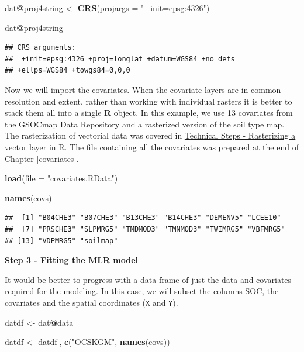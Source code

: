 \documentclass[10pt,b5paper,]{book}
\newenvironment{Shaded}{\begin{snugshade}}{\end{snugshade}}
\newcommand{\DataTypeTok}[1]{\textcolor[rgb]{0.13,0.29,0.53}{#1}}
\newcommand{\KeywordTok}[1]{\textcolor[rgb]{0.13,0.29,0.53}{\textbf{#1}}}
\newcommand{\NormalTok}[1]{#1}
\newcommand{\OperatorTok}[1]{\textcolor[rgb]{0.81,0.36,0.00}{\textbf{#1}}}
\newcommand{\StringTok}[1]{\textcolor[rgb]{0.31,0.60,0.02}{#1}}
\theoremstyle{definition}
\theoremstyle{definition}
\theoremstyle{definition}
\theoremstyle{remark}
\begin{document}
\begin{Shaded}
\begin{Highlighting}[]
\NormalTok{dat}\OperatorTok{@}\NormalTok{proj4string <-}\StringTok{ }\KeywordTok{CRS}\NormalTok{(}\DataTypeTok{projargs =} \StringTok{"+init=epsg:4326"}\NormalTok{)}

\NormalTok{dat}\OperatorTok{@}\NormalTok{proj4string}
\end{Highlighting}
\end{Shaded}

\begin{verbatim}
## CRS arguments:
##  +init=epsg:4326 +proj=longlat +datum=WGS84 +no_defs
## +ellps=WGS84 +towgs84=0,0,0
\end{verbatim}

Now we will import the covariates. When the covariate layers are in
common resolution and extent, rather than working with individual
rasters it is better to stack them all into a single \textbf{R} object.
In this example, we use 13 covariates from the GSOCmap Data Repository
and a rasterized version of the soil type map. The rasterization of
vectorial data was covered in
\protect\hyperlink{technical-steps---rasterizing-a-vector-layer-in-r}{Technical
Steps - Rasterizing a vector layer in R}. The file containing all the
covariates was prepared at the end of Chapter \ref{covariates}.

\begin{Shaded}
\begin{Highlighting}[]
\KeywordTok{load}\NormalTok{(}\DataTypeTok{file =} \StringTok{"covariates.RData"}\NormalTok{)}

\KeywordTok{names}\NormalTok{(covs)}
\end{Highlighting}
\end{Shaded}

\begin{verbatim}
##  [1] "B04CHE3" "B07CHE3" "B13CHE3" "B14CHE3" "DEMENV5" "LCEE10" 
##  [7] "PRSCHE3" "SLPMRG5" "TMDMOD3" "TMNMOD3" "TWIMRG5" "VBFMRG5"
## [13] "VDPMRG5" "soilmap"
\end{verbatim}

\textbf{Step 3 - Fitting the MLR model}

It would be better to progress with a data frame of just the data and
covariates required for the modeling. In this case, we will subset the
columns SOC, the covariates and the spatial coordinates (\texttt{X} and
\texttt{Y}).

\begin{Shaded}
\begin{Highlighting}[]
\NormalTok{datdf <-}\StringTok{ }\NormalTok{dat}\OperatorTok{@}\NormalTok{data}

\NormalTok{datdf <-}\StringTok{ }\NormalTok{datdf[, }\KeywordTok{c}\NormalTok{(}\StringTok{"OCSKGM"}\NormalTok{, }\KeywordTok{names}\NormalTok{(covs))]}
\end{Highlighting}
\end{Shaded}
\end{document}

